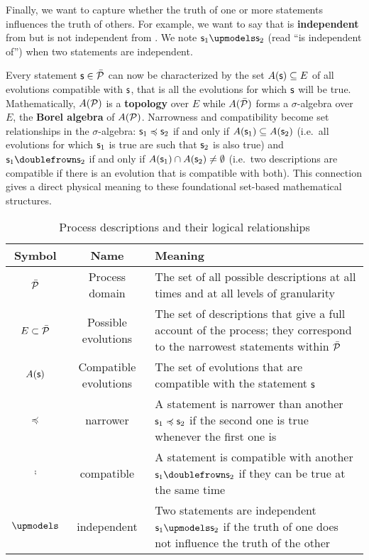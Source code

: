 \documentclass[letterpaper]{article}
\begin{document}
Finally, we want to capture whether the truth of one or more statements influences the truth of others. For example, we want to say that  is \textbf{independent} from  but is not independent from . We note $\stmt_1 \indep \stmt_2$ (read ``is independent of'') when two statements are independent.

Every statement $\stmt \in \tdomain[P]$ can now be characterized by the set $A(\stmt) \subseteq E$ of all evolutions compatible with $\stmt$, that is all the evolutions for which $\stmt$ will be true. Mathematically,  $A(\edomain[P])$ is a \textbf{topology} over $E$ while $A(\tdomain[P])$ forms a $\sigma$-algebra over $E$, the \textbf{Borel algebra} of $A(\edomain[P])$. Narrowness and compatibility become set relationships in the $\sigma$-algebra: $\stmt_1 \narrower \stmt_2$ if and only if $A(\stmt_1) \subseteq A(\stmt_2)$ (i.e.~all evolutions for which $\stmt_1$ is true are such that $\stmt_2$ is also true) and $\stmt_1 \comp \stmt_2$ if and only if $A(\stmt_1) \cap A(\stmt_2) \neq \emptyset$ (i.e.~two descriptions are compatible if there is an evolution that is compatible with both). This connection gives a direct physical meaning to these foundational set-based mathematical structures.

\begin{table}[h!]
	\centering
\begin{tabular}[h]{|c|c|p{6cm}|}
	\hline 
	Symbol & Name & Meaning \\ 
	\hline 
	$\tdomain[P]$ & Process domain & The set of all possible descriptions at all times and at all levels of granularity \\ 
	\hline 
	$E \subset \tdomain[P]$ & Possible evolutions & The set of descriptions that give a full account of the process; they correspond to the narrowest statements within $\tdomain[P]$ \\ 
	\hline 
	$A(\stmt)$ & Compatible evolutions & The set of evolutions that are compatible with the statement $\stmt$ \\ 
	\hline 
	$\narrower$ & narrower & A statement is narrower than another $\stmt_1 \narrower \stmt_2$ if the second one is true whenever the first one is \\ 
	\hline 
	$\comp$ & compatible & A statement is compatible with another $\stmt_1 \comp \stmt_2$ if they can be true at the same time \\ 
	\hline 
	$\indep$ & independent & Two statements are independent  $\stmt_1 \indep \stmt_2$ if the truth of one does not influence the truth of the other \\ 
\hline 
\end{tabular} 
	\caption{Process descriptions and their logical relationships}
	\label{table:logic}
\end{table}
\end{document}
